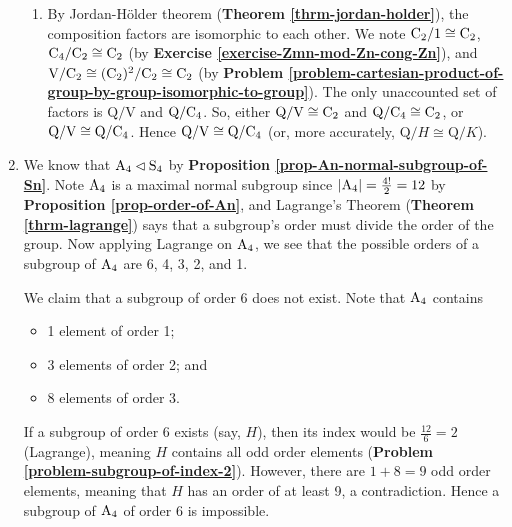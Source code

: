 \begin{enumerate}
\begin{enumerate}[label=(\roman*)]
        \item By Jordan-H\"older theorem (\textbf{Theorem \ref{thrm-jordan-holder}}), the composition factors are isomorphic to each other. We note $\mathrm{C}_{2} / 1 \cong \mathrm{C}_{2}$, $\mathrm{C}_{4} / \mathrm{C}_{2} \cong \mathrm{C}_{2}$ (by \textbf{Exercise \ref{exercise-Zmn-mod-Zn-cong-Zn}}), and $\mathrm{V} / \mathrm{C}_{2} \cong (\mathrm{C}_{2})^2 / \mathrm{C}_{2} \cong \mathrm{C}_{2}$ (by \textbf{Problem \ref{problem-cartesian-product-of-group-by-group-isomorphic-to-group}}). The only unaccounted set of factors is $\mathrm{Q}/\mathrm{V}$ and $\mathrm{Q}/\mathrm{C}_{4}$. So, either $\mathrm{Q}/\mathrm{V} \cong \mathrm{C}_{2}$ and $\mathrm{Q}/\mathrm{C}_{4} \cong \mathrm{C}_{2}$, or $\mathrm{Q}/\mathrm{V} \cong \mathrm{Q}/\mathrm{C}_{4}$. Hence $\mathrm{Q}/\mathrm{V} \cong \mathrm{Q}/\mathrm{C}_{4}$ (or, more accurately, $\mathrm{Q}/H \cong \mathrm{Q}/K$).
    \end{enumerate}
    
    \item We know that $\mathrm{A}_{4} \lhd \mathrm{S}_{4}$ by \textbf{Proposition \ref{prop-An-normal-subgroup-of-Sn}}. Note $\mathrm{A}_{4}$ is a maximal normal subgroup since $|\mathrm{A}_{4}| = \frac{4!}2 = 12$ by \textbf{Proposition \ref{prop-order-of-An}}, and Lagrange's Theorem (\textbf{Theorem \ref{thrm-lagrange}}) says that a subgroup's order must divide the order of the group. Now applying Lagrange on $\mathrm{A}_{4}$, we see that the possible orders of a subgroup of $\mathrm{A}_{4}$ are 6, 4, 3, 2, and 1.
    
    We claim that a subgroup of order 6 does not exist. Note that $\mathrm{A}_{4}$ contains
    \begin{itemize}
        \item 1 element of order 1;
        \item 3 elements of order 2; and
        \item 8 elements of order 3.
    \end{itemize}
    If a subgroup of order 6 exists (say, $H$), then its index would be $\frac{12}{6} = 2$ (Lagrange), meaning $H$ contains all odd order elements (\textbf{Problem \ref{problem-subgroup-of-index-2}}). However, there are $1 + 8 = 9$ odd order elements, meaning that $H$ has an order of at least 9, a contradiction. Hence a subgroup of $\mathrm{A}_{4}$ of order 6 is impossible.
    

\end{enumerate}
